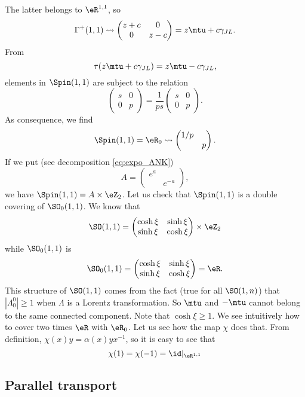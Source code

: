 The latter belongs to $\eR^{1,1}$, so
\[
	\Gamma^+(1,1)\leadsto\begin{pmatrix}
		z+c & 0 \\0&z-c
	\end{pmatrix}=z\mtu+c\gamma_{JL}.
\]
From
\[
	\tau(z\mtu+c\gamma_{JL})=z\mtu-c\gamma_{JL},
\]
elements in $\Spin(1,1)$ are subject to the relation
\[
	\begin{pmatrix}
		s & 0 \\0&p
	\end{pmatrix}=
	\frac{1}{ ps }\begin{pmatrix}
		s & 0 \\0&p
	\end{pmatrix}.
\]
As consequence, we find
\begin{equation}
	\Spin(1,1)=\eR_0\leadsto
	\begin{pmatrix}
		1/p \\&p
	\end{pmatrix}.
\end{equation}
If we put (see decomposition \eqref{eq:expo_ANK})
\[
	A=\begin{pmatrix}
		e^{a} \\& e^{-a}
	\end{pmatrix},
\]
we have $\Spin(1,1)=A\times\eZ_2$. Let us check that $\Spin(1,1)$ is a double covering of $\SO_0(1,1)$. We know that
\[
	\SO(1,1)=\begin{pmatrix}
		\cosh\xi & \sinh\xi \\\sinh\xi&\cosh\xi
	\end{pmatrix}\times\eZ_2
\]
while $\SO_0(1,1)$ is
\[
	\SO_0(1,1)=\begin{pmatrix}
		\cosh\xi & \sinh\xi \\\sinh\xi&\cosh\xi
	\end{pmatrix}=\eR.
\]
This structure of $\SO(1,1)$ comes from the fact (true for all $\SO(1,n)$) that $| \Lambda^0_0 |\geq1$ when $\Lambda$ is a Lorentz transformation. So $\mtu$ and $-\mtu$ cannot belong to the same connected component. Note that $\cosh\xi\geq 1$.
We see intuitively how to cover two times $\eR$ with $\eR_0$. Let us see how the map $\chi$ does that. From definition, $\chi(x)y=\alpha(x)yx^{-1}$, so it is easy to see that
\[
	\chi(1)=\chi(-1)=\id|_{\eR^{1,1}}
\]

\subsection{Parallel transport}


